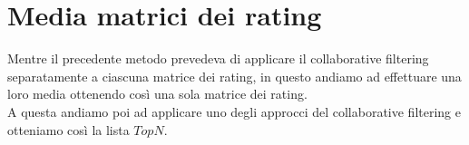 \section{Media matrici dei rating}
Mentre il precedente metodo prevedeva di applicare il collaborative filtering separatamente a ciascuna matrice dei rating, in questo andiamo ad effettuare una loro media ottenendo così una sola matrice dei rating.\\
A questa andiamo poi ad applicare uno degli approcci del collaborative filtering e otteniamo così la lista $TopN$.